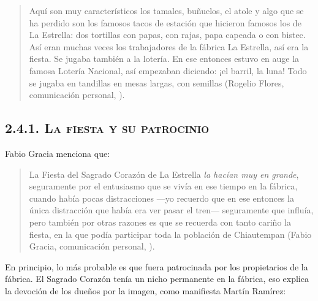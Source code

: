 \documentclass[14pt,letterpaper,twoside]{extbook} %
\begin{document}
\begin{quotation}
\noindent Aquí son muy característicos los tamales, buñuelos, el atole y algo que se ha perdido son los famosos tacos de estación que hicieron famosos los de La Estrella: dos tortillas con papas, con rajas, papa capeada o con bistec. Así eran muchas veces los trabajadores de la fábrica La Estrella, así era la fiesta. Se jugaba también a la lotería. En ese entonces estuvo en auge la famosa Lotería Nacional, así empezaban diciendo: ¡el barril, la luna! Todo se jugaba en tandillas en mesas largas, con semillas (Rogelio Flores, comunicación personal, ).
\end{quotation}

\subsection*{\mdseries\large\textsc{2.4.1. La fiesta y su patrocinio}}

\noindent Fabio Gracia menciona que:

\begin{quotation}
\noindent La Fiesta del Sagrado Corazón de La Estrella \textit{la hacían muy en grande}, seguramente por el entusiasmo que se vivía en ese tiempo en la fábrica, cuando había pocas distracciones ---yo recuerdo que en ese entonces la única distracción que había era ver pasar el tren--- seguramente que influía, pero también por otras razones es que se recuerda con tanto cariño la fiesta, en la que podía participar toda la población de Chiautempan (Fabio Gracia, comunicación personal, ).
\end{quotation}

\noindent En principio, lo más probable es que fuera patrocinada por los propietarios de la fábrica. El Sagrado Corazón tenía un nicho permanente en la fábrica, eso explica la devoción de los dueños por la imagen, como manifiesta Martín Ramírez:
\end{document}
